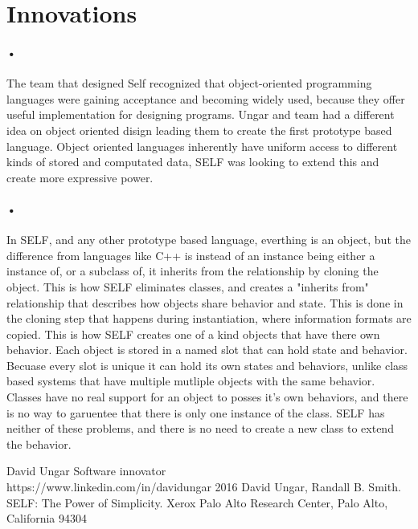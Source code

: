 \documentclass[12pt]{article}
\begin{document}
\section{Innovations}
\paragraph{•} The team that designed Self recognized that object-oriented programming languages were gaining acceptance and becoming widely used, because they offer useful implementation for designing programs. Ungar and team had a different idea on object oriented disign leading them to create the first prototype based language. Object oriented languages inherently have uniform access to different kinds of stored and computated data, SELF was looking to extend this and create more expressive power. \cite{power}
\paragraph{•} In SELF, and any other prototype based language, everthing is an object, but the difference from languages like C++ is instead of an instance being either a instance of, or a subclass of, it inherits from the relationship by cloning the object. This is how SELF eliminates classes, and creates a "inherits from" relationship that describes how objects share behavior and state. This is done in the cloning step that happens during instantiation, where information formats are copied. This is how SELF creates one of a kind objects that have there own behavior. Each object is stored in a named slot that can hold state and behavior. Becuase every slot is unique it can hold its own states and behaviors, unlike class based systems that have multiple mutliple objects with the same behavior. Classes have no real support for an object to posses it's own behaviors, and there is no way to garuentee that there is only one instance of the class. SELF has neither of these problems, and there is no need to create a new class to extend the behavior. \cite{power}

\begin{thebibliography}{9}
 David Ungar Software innovator\\ https://www.linkedin.com/in/davidungar 2016
 David Ungar, Randall B. Smith. SELF: The Power of Simplicity. Xerox Palo Alto Research Center, Palo Alto, California 94304
\end{thebibliography}
\end{document}
